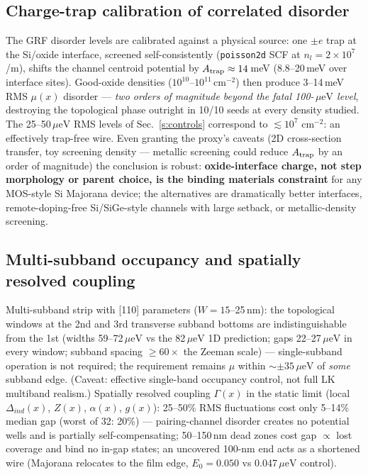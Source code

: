 \documentclass[11pt]{article}
\newcommand{\ueV}{\,\mu\mathrm{eV}}
\begin{document}
\subsection{Charge-trap calibration of correlated disorder}\label{s:trap}
The GRF disorder levels are calibrated against a physical source: one
$\pm e$ trap at the Si/oxide interface, screened self-consistently
(\texttt{poisson2d} SCF at $n_l = 2\times10^7$/m), shifts the channel
centroid potential by $A_{\rm trap} \approx 14$\,meV (8.8--20\,meV over
interface sites). Good-oxide densities ($10^{10}$--$10^{11}$\,cm$^{-2}$)
then produce 3--14\,meV RMS $\mu(x)$ disorder --- \emph{two orders of
magnitude beyond the fatal 100-$\ueV$ level}, destroying the topological
phase outright in 10/10 seeds at every density studied. The 25--50$\ueV$
RMS levels of Sec.~\ref{s:controls} correspond to $\lesssim 10^7$
cm$^{-2}$: an effectively trap-free wire. Even granting the proxy's
caveats (2D cross-section transfer, toy screening density --- metallic
screening could reduce $A_{\rm trap}$ by an order of magnitude) the
conclusion is robust: \textbf{oxide-interface charge, not step morphology
or parent choice, is the binding materials constraint} for any MOS-style
Si Majorana device; the alternatives are dramatically better interfaces,
remote-doping-free Si/SiGe-style channels with large setback, or
metallic-density screening.

\subsection{Multi-subband occupancy and spatially resolved coupling}
\label{s:multi}
Multi-subband strip with [110] parameters ($W = 15$--25\,nm): the
topological windows at the 2nd and 3rd transverse subband bottoms are
indistinguishable from the 1st (widths 59--72$\ueV$ vs the 82$\ueV$ 1D
prediction; gaps 22--27$\ueV$ in every window; subband spacing
$\ge 60\times$ the Zeeman scale) --- single-subband operation is not
required; the requirement remains $\mu$ within $\sim\pm35\ueV$ of
\emph{some} subband edge. (Caveat: effective single-band occupancy
control, not full LK multiband realism.) Spatially resolved coupling
$\Gamma(x)$ in the static limit (local $\Delta_{ind}(x)$, $Z(x)$,
$\alpha(x)$, $g(x)$): 25--50\% RMS fluctuations cost only 5--14\% median
gap (worst of 32: 20\%) --- pairing-channel disorder creates no potential
wells and is partially self-compensating; 50--150\,nm dead zones cost gap
$\propto$ lost coverage and bind no in-gap states; an uncovered 100-nm
end acts as a shortened wire (Majorana relocates to the film edge,
$E_0 = 0.050$ vs 0.047$\ueV$ control).
\end{document}
